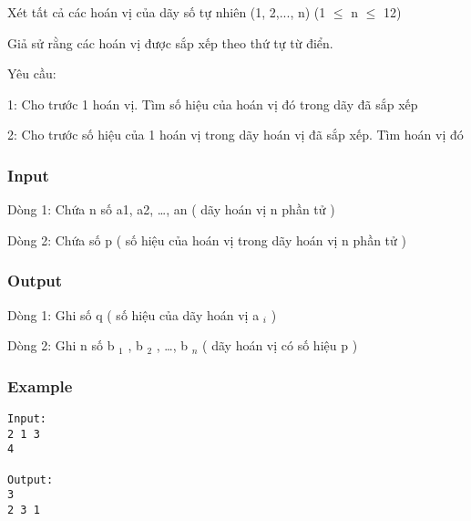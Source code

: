 



   Xét tất cả các hoán vị của dãy số tự nhiên (1, 2,..., n) (1  $\le$  n  $\le$  12)  

   Giả sử rằng các hoán vị được sắp xếp theo thứ tự từ điển.  

   Yêu cầu:  

   1: Cho trước 1 hoán vị. Tìm số hiệu của hoán vị đó trong dãy đã sắp xếp  

   2: Cho trước số hiệu của 1 hoán vị trong dãy hoán vị đã sắp xếp. Tìm hoán vị đó  

\subsubsection{   Input  }

   Dòng 1: Chứa n số a1, a2, …, an ( dãy hoán vị n phần tử )  

   Dòng 2: Chứa số p ( số hiệu của hoán vị trong dãy hoán vị n phần tử )  

\subsubsection{   Output  }

   Dòng 1: Ghi số q ( số hiệu của dãy hoán vị a   $_    i   $   )  

   Dòng 2: Ghi n số b   $_    1   $   , b   $_    2   $   , …, b   $_    n   $   ( dãy hoán vị có số hiệu p )  

\subsubsection{   Example  }
\begin{verbatim}
Input:
2 1 3
4

Output:
3
2 3 1 

\end{verbatim}
